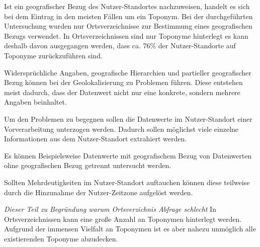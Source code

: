 			Ist ein geografischer Bezug des Nutzer-Standortes nachzuweisen, handelt es sich bei dem Eintrag in den meisten Fällen um ein Toponym.
			Bei der durchgeführten Untersuchung wurden nur Ortsverzeichnisse zur Bestimmung eines geografischen Bezugs verwendet.
			In Ortsverzeichnissen sind nur Toponyme hinterlegt es kann deshalb davon ausgegangen werden, dass ca. 76\% der Nutzer-Standorte auf Toponyme zurückzuführen sind.

			Widersprüchliche Angaben, geografische Hierarchien und partieller geografischer Bezug können bei der Geolokalisierung zu Problemen führen.
			Diese entstehen meist dadurch, dass der Datenwert nicht nur eine konkrete, sondern mehrere Angaben beinhaltet.
			
			Um den Problemen zu begegnen sollen die Datenwerte im Nutzer-Standort einer Vorverarbeitung unterzogen werden. 
			Dadurch sollen möglichst viele einzelne Informationen aus dem Nutzer-Standort extrahiert werden.

			Es können Beispielsweise Datenwerte mit geografischem Bezug von Datenwerten ohne geografischen Bezug getrennt untersucht werden.

			Sollten Mehrdeutigkeiten im Nutzer-Standort auftauchen können diese teilweise durch die Hinzunahme der Nutzer-Zeitzone aufgelöst werden.

			\textit{Dieser Teil zu Begründung warum Ortsverzichnis Abfrage schlecht} 
			In Ortsverzeichnissen kann eine große Anzahl an Toponymen hinterlegt werden.
			Aufgrund der immensen Vielfalt an Toponymen ist es aber nahezu unmöglich alle existierenden Toponyme abzudecken. 

	

			 



		
						
			